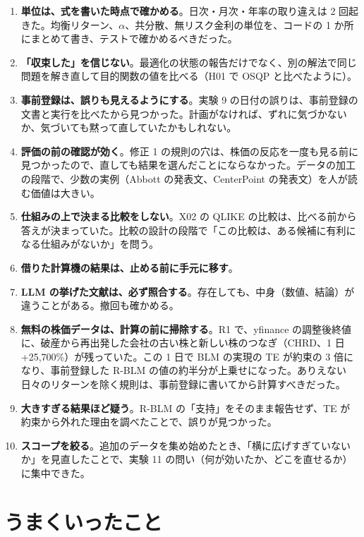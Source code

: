 \begin{enumerate}
\item \textbf{単位は、式を書いた時点で確かめる}。日次・月次・年率の取り違えは 2 回起きた。均衡リターン、$\alpha$、共分散、無リスク金利の単位を、コードの 1 か所にまとめて書き、テストで確かめるべきだった。
\item \textbf{「収束した」を信じない}。最適化の状態の報告だけでなく、別の解法で同じ問題を解き直して目的関数の値を比べる（H01 で OSQP と比べたように）。
\item \textbf{事前登録は、誤りも見えるようにする}。実験 9 の日付の誤りは、事前登録の文書と実行を比べたから見つかった。計画がなければ、ずれに気づかないか、気づいても黙って直していたかもしれない。
\item \textbf{評価の前の確認が効く}。修正 1 の規則の穴は、株価の反応を一度も見る前に見つかったので、直しても結果を選んだことにならなかった。データの加工の段階で、少数の実例（Abbott の発表文、CenterPoint の発表文）を人が読む価値は大きい。
\item \textbf{仕組みの上で決まる比較をしない}。X02 の QLIKE の比較は、比べる前から答えが決まっていた。比較の設計の段階で「この比較は、ある候補に有利になる仕組みがないか」を問う。
\item \textbf{借りた計算機の結果は、止める前に手元に移す}。
\item \textbf{LLM の挙げた文献は、必ず照合する}。存在しても、中身（数値、結論）が違うことがある。撤回も確かめる。
\item \textbf{無料の株価データは、計算の前に掃除する}。R1 で、yfinance の調整後終値に、破産から再出発した会社の古い株と新しい株のつなぎ（CHRD、1 日 +25,700\%）が残っていた。この 1 日で BLM の実現の TE が約束の 3 倍になり、事前登録した R-BLM の値の約半分が上乗せになった。ありえない日々のリターンを除く規則は、事前登録に書いてから計算すべきだった。
\item \textbf{大きすぎる結果ほど疑う}。R-BLM の「支持」をそのまま報告せず、TE が約束から外れた理由を調べたことで、誤りが見つかった。
\item \textbf{スコープを絞る}。追加のデータを集め始めたとき、「横に広げすぎていないか」を見直したことで、実験 11 の問い（何が効いたか、どこを直せるか）に集中できた。
\end{enumerate}

\section{うまくいったこと}

